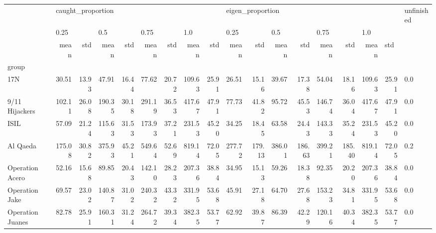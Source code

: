 \begin{tabular}{lrrrrrrrrrrrrrrrrl}
\toprule
{} & \multicolumn{8}{l}{caught\_proportion} & \multicolumn{8}{l}{eigen\_proportion} & unfinished \\
{} & \multicolumn{2}{l}{0.25} & \multicolumn{2}{l}{0.5} & \multicolumn{2}{l}{0.75} & \multicolumn{2}{l}{1.0} & \multicolumn{2}{l}{0.25} & \multicolumn{2}{l}{0.5} & \multicolumn{2}{l}{0.75} & \multicolumn{3}{l}{1.0} \\
{} &              mean &    std &    mean &    std &    mean &    std &    mean &    std &             mean &     std &    mean &     std &    mean &     std &    mean & \multicolumn{2}{l}{std} \\
group                &                   &        &         &        &         &        &         &        &                  &         &         &         &         &         &         &        &            \\
\midrule
17N                  &             30.51 &  13.93 &   47.91 &  16.44 &   77.62 &  20.72 &  109.63 &  25.91 &            26.51 &   15.16 &   39.67 &   17.38 &   54.04 &   18.16 &  109.63 &  25.91 &        0.0 \\
9/11 Hijackers       &            102.11 &  26.08 &  190.35 &  30.18 &  291.19 &  36.53 &  417.67 &  47.91 &            77.73 &   41.82 &   95.72 &   45.53 &  146.74 &   36.04 &  417.67 &  47.91 &        0.0 \\
ISIL                 &             57.09 &  21.24 &  115.63 &  31.53 &  173.93 &  37.21 &  231.53 &  45.20 &            34.25 &   18.45 &   63.58 &   24.43 &  143.33 &   35.24 &  231.53 &  45.20 &        0.0 \\
Al Qaeda             &            175.08 &  30.82 &  375.93 &  45.21 &  549.64 &  52.69 &  819.14 &  72.05 &           277.72 &  179.13 &  386.01 &  186.63 &  399.21 &  185.40 &  819.14 &  72.05 &        0.2 \\
Operation Acero      &             52.16 &  15.68 &   89.85 &  20.43 &  142.10 &  28.23 &  207.36 &  38.84 &            34.95 &   15.13 &   59.26 &   18.38 &   92.35 &   20.20 &  207.36 &  38.84 &        0.0 \\
Operation Jake       &             69.57 &  23.02 &  140.87 &  31.02 &  240.32 &  43.32 &  331.95 &  53.68 &            45.91 &   27.18 &   64.70 &   27.68 &  153.23 &   34.81 &  331.95 &  53.68 &        0.0 \\
Operation Juanes     &             82.78 &  25.91 &  160.31 &  31.24 &  264.72 &  39.34 &  382.35 &  53.77 &            62.92 &   39.87 &   86.39 &   42.29 &  120.16 &   40.34 &  382.35 &  53.77 &        0.0 \\

\end{tabular}
